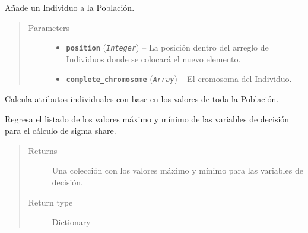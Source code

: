 \documentclass[class=report, crop=false]{standalone}
\begin{document}
\begin{fulllineitems}
\begin{fulllineitems}
Añade un Individuo a la Población.

\begin{quote}\begin{description}
\item[{Parameters}] \leavevmode\begin{itemize}
\item \textbf{\texttt{position}} (\emph{\texttt{Integer}}) -- La posición dentro del arreglo de Individuos 
donde se colocará el nuevo elemento.
\item \textbf{\texttt{complete\_chromosome}} (\emph{\texttt{Array}}) -- El cromosoma del Individuo.
\end{itemize}
\end{description}\end{quote}

\end{fulllineitems}

\begin{fulllineitems}

Calcula atributos individuales con base en los 
valores de toda la Población.

\end{fulllineitems}

\begin{fulllineitems}

Regresa el listado de los valores máximo y mínimo de las 
variables de decisión para el cálculo de sigma share.

\begin{quote}\begin{description}
\item[{Returns}] \leavevmode
Una colección con los valores máximo y mínimo para las
variables de decisión.
\item[{Return type}] \leavevmode
Dictionary
\end{description}\end{quote}

\end{fulllineitems}

\begin{fulllineitems}


\end{fulllineitems}
\end{fulllineitems}
\end{document}
